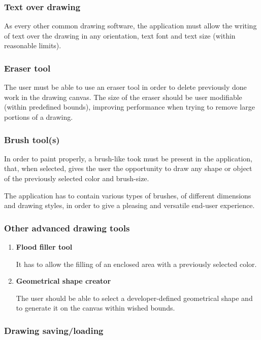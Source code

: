 \documentclass{article}
\begin{document}
\subsubsection{Text over drawing}
As every other common drawing software, the application must allow the writing of text over the drawing in any orientation, text font and text size (within reasonable limits).
\subsubsection{Eraser tool}
The user must be able to use an eraser tool in order to delete previously done work in the drawing canvas. The size of the eraser should be user modifiable (within predefined bounds), improving performance when trying to remove large portions of a drawing.
\subsubsection{Brush tool(s)}
In order to paint properly, a brush-like took must be present in the application, that, when selected, gives the user the opportunity to draw any shape or object of the previously selected color and brush-size.

The application has to contain various types of brushes, of different dimensions and drawing styles, in order to give a pleasing and versatile end-user experience.

\subsubsection{Other advanced drawing tools}
\begin{enumerate}

\item \textbf{Flood filler tool}

It has to allow the filling of an enclosed area with a previously selected color.

\item  \textbf{Geometrical shape creator}

The user should be able to select a developer-defined geometrical shape and to generate it on the canvas within wished bounds.

\end{enumerate}

\subsubsection{Drawing saving/loading}
\end{document}
